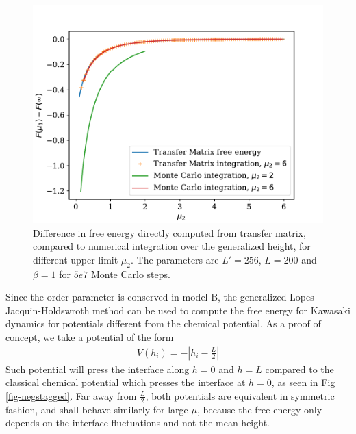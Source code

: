 \begin{figure}
    \centering
    \includegraphics[width=0.7\linewidth]{int-dyn/integration-free-ene.pdf}
    \caption{Difference in free energy directly computed from transfer matrix, compared to numerical integration over the generalized height, for different upper limit $\mu_2$. The parameters are $L' = 256$, $L=200$ and $\beta=1$ for $5e7$ Monte Carlo steps.}
    \label{integration-free-ene}
\end{figure}

Since the order parameter is conserved in model B, the generalized Lopes-Jacquin-Holdswroth method can be used to compute the free energy for Kawasaki dynamics for potentials different from the chemical potential. 
As a proof of concept, we take a potential of the form
\begin{align}
    V(h_i) = - |h_i-\frac{L}{2}|
    \label{neggstaged}
\end{align}
Such potential will press the interface along $h=0$ and $h=L$ compared to the classical chemical potential which presses the interface at $h=0$, as seen in Fig \ref{fig-negstagged}. Far away from $\frac{L}{2}$, both potentials are equivalent in symmetric fashion, and shall behave similarly for large $\mu$, because the free energy only depends on the interface fluctuations and not the mean height. 


